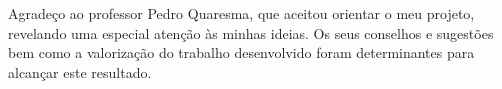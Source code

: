 
\begin{acknowledgements}


Agradeço ao professor Pedro Quaresma, que aceitou orientar o meu projeto, revelando uma especial atenção às minhas ideias. Os seus conselhos e sugestões bem como a valorização do trabalho desenvolvido foram determinantes para alcançar este resultado.

\end{acknowledgements}

